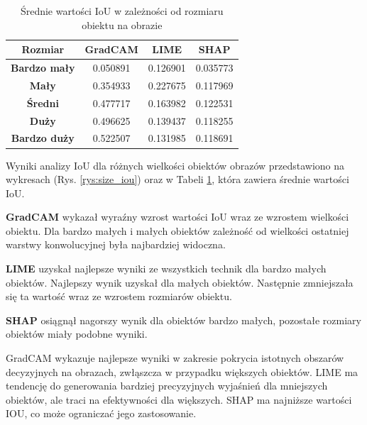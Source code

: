 \begin{table}[h]
	\centering
	\begin{tabular}{|c|c|c|c|}
		\hline
		\textbf{Rozmiar}     & \textbf{GradCAM} & \textbf{LIME} & \textbf{SHAP} \\
		\hline
		\textbf{Bardzo mały} & 0.050891         & 0.126901      & 0.035773      \\
		\hline
		\textbf{Mały}        & 0.354933         & 0.227675      & 0.117969      \\
		\hline
		\textbf{Średni}      & 0.477717         & 0.163982      & 0.122531      \\
		\hline
		\textbf{Duży}        & 0.496625         & 0.139437      & 0.118255      \\
		\hline
		\textbf{Bardzo duży} & 0.522507         & 0.131985      & 0.118691      \\
		\hline
	\end{tabular}
	\caption{Średnie wartości IoU w zależności od rozmiaru obiektu na obrazie}
	\label{tab:size_iou}
\end{table}

Wyniki analizy IoU dla różnych wielkości obiektów obrazów przedstawiono na wykresach (Rys. \ref{rys:size_iou}) oraz w Tabeli \ref{tab:size_iou}, która zawiera średnie wartości IoU.

\textbf{GradCAM} wykazał wyraźny wzrost wartości IoU wraz ze wzrostem wielkości obiektu.
Dla bardzo małych i małych obiektów zależność od wielkości ostatniej warstwy konwolucyjnej była najbardziej widoczna.

\textbf{LIME} uzyskał najlepsze wyniki ze wszystkich technik dla bardzo małych obiektów.
Najlepszy wynik uzyskał dla małych obiektów.
Następnie zmniejszała się ta wartość wraz ze wzrostem rozmiarów obiektu.

\textbf{SHAP} osiągnął nagorszy wynik dla obiektów bardzo małych, pozostałe rozmiary obiektów miały podobne wyniki.

GradCAM wykazuje najlepsze wyniki w zakresie pokrycia istotnych obszarów decyzyjnych na obrazach, zwłąszcza w przypadku większych obiektów.
LIME ma tendencję do generowania bardziej precyzyjnych wyjaśnień dla mniejszych obiektów, ale traci na efektywności dla większych.
SHAP ma najniższe wartości IOU, co może ograniczać jego zastosowanie.

\vspace{1cm}



